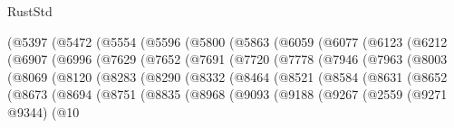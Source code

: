 \begin{lexlean}{RustStd}
\begin{coremodule}
                (@5397
                  (@5472
                    (@5554
                      (@5596
                        (@5800
                          (@5863
                            (@6059
                              (@6077
                                (@6123
                                  (@6212
                                    (@6907
                                      (@6996
                                        (@7629
                                          (@7652
                                            (@7691
                                              (@7720
                                                (@7778
                                                  (@7946
                                                    (@7963
                                                      (@8003
                                                        (@8069
                                                          (@8120
                                                            (@8283
                                                              (@8290
                                                                (@8332
                                                                  (@8464
                                                                    (@8521
                                                                      (@8584
                                                                        (@8631
                                                                          (@8652
                                                                            (@8673
                                                                              (@8694
                                                                                (@8751
                                                                                  (@8835
                                                                                    (@8968
                                                                                      (@9093
                                                                                        (@9188
                                                                                          (@9267
                                                                                            (@2559
                                                                                              (@9271
                                                                                                @9344)
                                                                                              (@10

\end{coremodule}
\end{lexlean}
